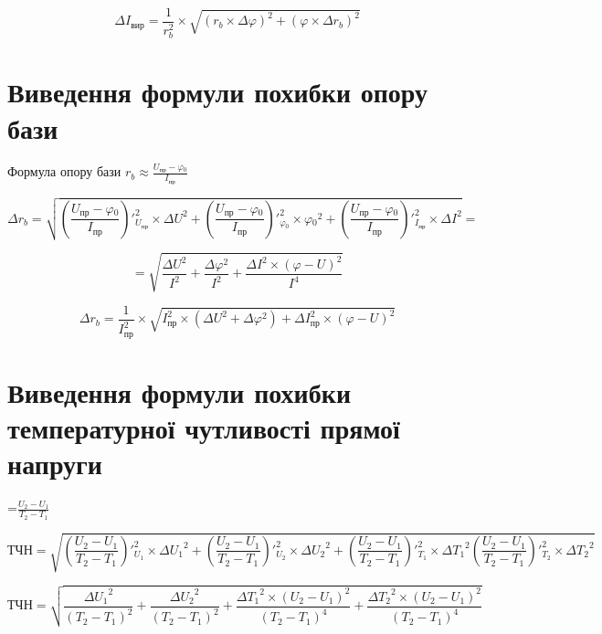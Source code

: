\documentclass[a4paper,14pt]{article}
\begin{document}
\begin{equation}
\Delta{ I_{\text{вир}}   }=\boxed{\frac{1}{r_b^2}\times{ \sqrt{(r_b\times{\Delta{\varphi}})^2+(\varphi\times{\Delta{r_b}})^2    }}}
\end{equation}


\section{Виведення формули похибки опору бази }
Формула опору бази $r_b\approx{\frac{U_{\text{пр}}-\varphi{_0}}{I_{\text{пр}}}  }$

\begin{equation}
\Delta{r_b}=\sqrt{  \left(\frac{U_{\text{пр}}-\varphi{_0}}{I_{\text{пр}}}\right)'^2_{U_{\text{пр}}}\times{\Delta{U}^2}+\left(\frac{U_{\text{пр}}-\varphi{_0}}{I_{\text{пр}}}\right)'^2_{\varphi{_0}}\times{\varphi{_0}^2}+\left(\frac{U_{\text{пр}}-\varphi{_0}}{I_{\text{пр}}}\right)'^2_{I_{\text{пр}}}\times{\Delta{I}^2}  }=
\end{equation}


\begin{equation}
=\sqrt{\frac{\Delta{U^2}}{I^2}+\frac{\Delta{\varphi^2}}{I^2}+\frac{\Delta{I^2}\times{(\varphi-U)^2}}{I^4}                }
\end{equation}

\begin{equation}
\Delta{r_b}=\boxed{ \frac{1}{I_{\text{пр}}^2}\times{\sqrt{I_{\text{пр}}^2\times{(\Delta{U}^2+\Delta{\varphi}^2)}+\Delta{I_{\text{пр}}^2}\times{(\varphi-U)^2}        }   }}
\end{equation}


\section{Виведення формули похибки температурної чутливості прямої напруги }
=$\frac{U_2-U_1}{T_2-T_1}$


\begin{equation}
\text{ТЧН}=\sqrt{\left(\frac{U_2-U_1}{T_2-T_1}\right)'^2_{U_1}\times{\Delta{U_1}^2}+\left(\frac{U_2-U_1}{T_2-T_1}\right)'^2_{U_2}\times{\Delta{U_2}^2}+\left(\frac{U_2-U_1}{T_2-T_1}\right)'^2_{T_1}\times{\Delta{T_1}^2}\left(\frac{U_2-U_1}{T_2-T_1}\right)'^2_{T_2}\times{\Delta{T_2}^2}                                  }
\end{equation}

\begin{equation}
\text{ТЧН}=\sqrt{ \frac{\Delta{U_1}^2}{(T_2-T_1)^2}+\frac{\Delta{U_2}^2}{(T_2-T_1)^2}+\frac{\Delta{T_1}^2\times{(U_2-U_1)^2}}{(T_2-T_1)^4}+\frac{\Delta{T_2}^2\times{(U_2-U_1)^2}}{(T_2-T_1)^4}}
\end{equation}
\end{document}
